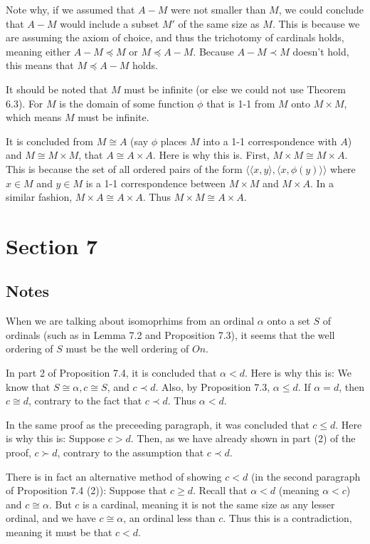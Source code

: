 \documentclass{article}
\theoremstyle{definition}
\begin{document}
Note why, if we assumed that $A-M$ were not smaller than $M$, we could conclude that $A-M$ would include a subset $M'$ of the same 
size as $M$. This is because we are assuming the axiom of choice, and thus the trichotomy of cardinals holds, meaning either 
$A-M\preceq M$ or $M\preceq A-M$. Because $A-M\prec M$ doesn't hold, this means that $M\preceq A-M$ holds. 

It should be noted that $M$ must be infinite (or else we could not use Theorem 6.3). For $M$ is the domain of some function 
$\phi$ that is 1-1 from $M$ onto $M\times M$, which means $M$ must be infinite.

It is concluded from $M\cong A$ (say $\phi$ places $M$ into a 1-1 correspondence with $A$)
and $M\cong M\times M$, that $A\cong A\times A$. Here is why this is. 
First, $M\times M\cong M\times A$. This is because the set of all ordered pairs of the form 
$\langle \langle x,y\rangle,\langle x,\phi(y)\rangle\rangle$ where $x\in M$ and $y\in M$ is a 1-1 correspondence between 
$M\times M$ and $M\times A$. In a similar fashion, $M\times A\cong A\times A$. Thus $M\times M\cong A\times A$.

\section*{Section 7}

\subsection*{Notes}
When we are talking about isomoprhims from an ordinal $\alpha$ onto a set $S$ of ordinals (such as in Lemma 7.2 and Proposition 7.3), it 
seems that the well ordering of $S$ must be the well ordering of $On$.

In part 2 of Proposition 7.4, it is concluded that $\alpha <d$. Here is why this is: We know that $S\cong\alpha,c\cong S$, and $c\prec d$. Also, 
by Proposition 7.3, $\alpha\le d$. If $\alpha =d$, then $c\cong d$, contrary to the fact that $c\prec d$. Thus $\alpha<d$. 

In the same proof as the preceeding paragraph, it was concluded that $c\le d$. Here is why this is: Suppose 
$c>d$. Then, as we have already shown in part (2) of the proof, $c\succ d$, contrary to the assumption that 
$c\prec d$.

There is in fact an alternative method of showing $c<d$ (in the second paragraph of Proposition 7.4 (2)): Suppose that 
$c\ge d$. Recall that $\alpha<d$ (meaning $\alpha<c$) and $c\cong\alpha$. 
But $c$ is a cardinal, meaning it is not the same size as any lesser ordinal, and 
we have $c\cong\alpha$, an ordinal less than $c$. Thus this is a contradiction, meaning it must be that $c<d$.
\end{document}
